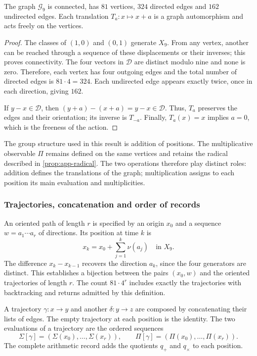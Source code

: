 \begin{proposicion}
\label{geo:prop-cayley}
The graph $\mathscr G_9$ is connected, has $81$ vertices, $324$ directed edges and $162$ undirected edges. Each translation $T_a:x\mapsto x+a$ is a graph automorphism and acts freely on the vertices.
\end{proposicion}

\begin{proof}
The classes of $(1,0)$ and $(0,1)$ generate $X_9$. From any vertex, another can be reached through a sequence of these displacements or their inverses; this proves connectivity. The four vectors in $\mathscr D$ are distinct modulo nine and none is zero. Therefore, each vertex has four outgoing edges and the total number of directed edges is $81\cdot4=324$. Each undirected edge appears exactly twice, once in each direction, giving $162$.

If $y-x\in\mathscr D$, then $(y+a)-(x+a)=y-x\in\mathscr D$. Thus, $T_a$ preserves the edges and their orientation; its inverse is $T_{-a}$. Finally, $T_a(x)=x$ implies $a=0$, which is the freeness of the action.
\end{proof}

The group structure used in this result is addition of positions. The multiplicative observable $\Pi$ remains defined on the same vertices and retains the radical described in \cref{prop:app-radical}. The two operations therefore play distinct roles: addition defines the translations of the graph; multiplication assigns to each position its main evaluation and multiplicities.

\subsubsection{Trajectories, concatenation and order of records}

An oriented path of length $r$ is specified by an origin $x_0$ and a sequence $w=a_1\cdots a_r$ of directions. Its position at time $k$ is
\[
 x_k=x_0+\sum_{j=1}^{k}\nu(a_j)\quad\text{in }X_9.
\]
The difference $x_k-x_{k-1}$ recovers the direction $a_k$, since the four generators are distinct. This establishes a bijection between the pairs $(x_0,w)$ and the oriented trajectories of length $r$. The count $81\cdot4^r$ includes exactly the trajectories with backtracking and returns admitted by this definition.

\begin{definicion}
\label{geo:def-composicion}
A trajectory $\gamma:x\to y$ and another $\delta:y\to z$ are composed by concatenating their lists of edges. The empty trajectory at each position is the identity. The two evaluations of a trajectory are the ordered sequences
\[
 \Sigma[\gamma]=(\Sigma(x_0),\ldots,\Sigma(x_r)),\qquad
 \Pi[\gamma]=(\Pi(x_0),\ldots,\Pi(x_r)).
\]
The complete arithmetic record adds the quotients $q_+$ and $q_\times$ to each position.
\end{definicion}

